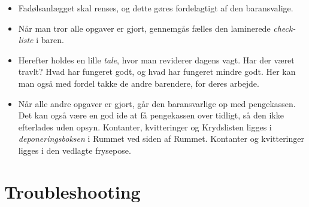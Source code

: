 \begin{itemize}
    \item Fadølsanlægget skal renses, og dette gøres fordelagtigt af den baransvalige.
    \item Når man tror alle opgaver er gjort, gennemgås fælles den laminerede \textit{check-liste} i baren.
    \item Herefter holdes en lille \textit{tale}, hvor man reviderer dagens vagt. Har der været travlt? 
    Hvad har fungeret godt, og hvad har fungeret mindre godt.
    Her kan man også med fordel takke de andre barendere, for deres arbejde.
    \item Når alle andre opgaver er gjort, går den baransvarlige op med pengekassen. 
    Det kan også være en god ide at få pengekassen over tidligt, så den ikke efterlades uden opsyn.
    Kontanter, kvitteringer og Krydslisten ligges i \textit{deponeringsboksen} i Rummet ved
    siden af Rummet. Kontanter og kvitteringer ligges i den vedlagte frysepose.
\end{itemize}

\newpage
\section{Troubleshooting}
\label{sec:troubleshooting}


